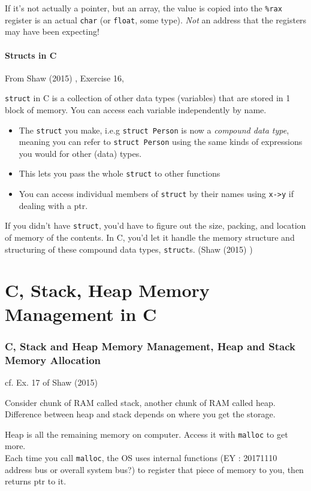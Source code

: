 \documentclass[10pt]{amsart}
\begin{document}
If it's not actually a pointer, but an array, the value is copied into the \verb|%rax| register is an actual \verb|char| (or \verb|float|, some type).  \emph{Not} an address that the registers may have been expecting!  


\subsection{Structs in C}
From Shaw (2015) \cite{Shaw2015}, Exercise 16, 

\verb|struct| in C is a collection of other data types (variables) that are stored in 1 block of memory.  You can access each variable independently by name.  

\begin{itemize}
	\item The \verb|struct| you make, i.e.g \verb|struct Person| is now a \emph{compound data type}, meaning you can refer to \verb|struct Person| using the same kinds of expressions you would for other (data) types.
	\item This lets you pass the whole \verb|struct| to other functions
	\item You can access individual members of \verb|struct| by their names using \verb|x->y| if dealing with a ptr.  
\end{itemize}  

If you didn't have \verb|struct|, you'd have to figure out the size, packing, and location of memory of the contents.  In C, you'd let it handle the memory structure and structuring of these compound data types, \verb|struct|s.  (Shaw (2015) \cite{Shaw2015})



\part{C, Stack, Heap Memory Management in C}

\section{C, Stack and Heap Memory Management, Heap and Stack Memory Allocation}  


cf. Ex. 17 of Shaw (2015) \cite{Shaw2015}

Consider chunk of RAM called stack, another chunk of RAM called heap.  Difference between heap and stack depends on where you get the storage.  

Heap is all the remaining memory on computer.  Access it with \verb|malloc| to get more.  \\
Each time you call \verb|malloc|, the OS uses internal functions (EY : 20171110 address bus or overall system bus?) to register that piece of memory to you, then returns ptr to it.  
\end{document}
